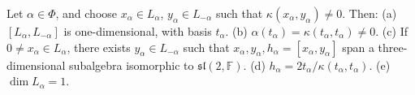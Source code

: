 Let $\alpha \in \Phi$, and choose $x_\alpha \in L_\alpha$, $y_\alpha \in L_{-\alpha}$ such that $\kappa(x_\alpha, y_\alpha) \neq 0$. Then:
(a) $[L_\alpha, L_{-\alpha}]$ is one-dimensional, with basis $t_\alpha$.
(b) $\alpha(t_\alpha) = \kappa(t_\alpha, t_\alpha) \neq 0$.
(c) If $0 \neq x_\alpha \in L_\alpha$, there exists $y_\alpha \in L_{-\alpha}$ such that $x_\alpha, y_\alpha, h_\alpha = [x_\alpha, y_\alpha]$ span a three-dimensional subalgebra isomorphic to $\mathfrak{sl}(2, \mathbb{F})$.
(d) $h_\alpha = 2t_\alpha/\kappa(t_\alpha, t_\alpha)$.
(e) $\dim L_\alpha = 1$.
